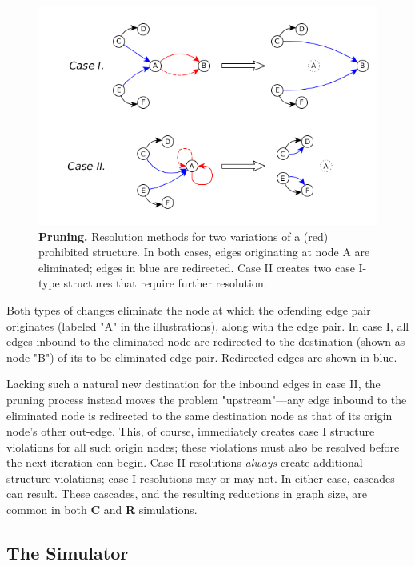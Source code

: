 \documentclass{tufte-handout}
\begin{document}
\begin{figure}
\includegraphics{pruning.png}
\caption{\textbf{Pruning.} Resolution methods for two variations of a (red) prohibited structure.
In both cases, edges originating at node A are eliminated; edges in blue are redirected.
Case II creates two case I-type structures that require further resolution.}
\label{fig:Pruning}
\end{figure}

Both types of changes eliminate the node at which the offending edge pair
originates (labeled "A" in the illustrations), along with the edge pair.
In case I, all edges inbound to the eliminated node are redirected to 
the destination (shown as node "B") of its to-be-eliminated edge pair.
Redirected edges are shown in blue.

Lacking such a natural new destination for the inbound edges in case II, the
pruning process instead moves the problem "upstream"---any edge inbound to
the eliminated node is redirected to the same destination node as that of
its origin node's other out-edge. This, of course, immediately creates
case I structure violations for all such origin nodes; these violations must also be
resolved before the next iteration can begin.
Case II resolutions \textit{always} create additional structure violations;
case I resolutions may or may not. In either case, cascades can result. These
cascades, and the resulting reductions in graph size, are common in both
\textbf{C} and \textbf{R} simulations.

\subsection{The Simulator}
\end{document}
